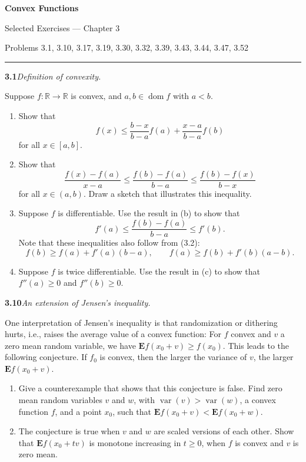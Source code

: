 \documentclass[11pt,a4paper]{article}
\newcommand{\R}{\mathbb{R}}
\newcommand{\dom}{\operatorname{dom}}
\newcommand{\var}{\operatorname{var}}
\newcommand{\E}{\mathbf{E}}
\newcommand{\ex}[2]{%
  \Needspace{5\baselineskip}%
  \par\medskip\noindent\textbf{#1}\quad\textit{#2}\quad\ignorespaces
}
\begin{document}
\begin{center}
  {\LARGE\bfseries Convex Functions}\par
  \vspace{0.4em}
  {\large Selected Exercises --- Chapter 3}\par
  \vspace{0.25em}
  {\small Problems 3.1, 3.10, 3.17, 3.19, 3.30, 3.32, 3.39, 3.43, 3.44, 3.47, 3.52}
\end{center}
\vspace{0.35em}\hrule\vspace{0.8em}

\ex{3.1}{Definition of convexity.}
Suppose $f:\R\to\R$ is convex, and $a,b\in\dom f$ with $a<b$.
\begin{enumerate}
\item Show that
\[
  f(x)\leq \frac{b-x}{b-a}f(a)+\frac{x-a}{b-a}f(b)
\]
for all $x\in[a,b]$.
\item Show that
\[
  \frac{f(x)-f(a)}{x-a}\leq
  \frac{f(b)-f(a)}{b-a}\leq
  \frac{f(b)-f(x)}{b-x}
\]
for all $x\in(a,b)$. Draw a sketch that illustrates this inequality.
\item Suppose $f$ is differentiable. Use the result in (b) to show that
\[
  f'(a)\leq \frac{f(b)-f(a)}{b-a}\leq f'(b).
\]
Note that these inequalities also follow from (3.2):
\[
  f(b)\geq f(a)+f'(a)(b-a),\qquad
  f(a)\geq f(b)+f'(b)(a-b).
\]
\item Suppose $f$ is twice differentiable. Use the result in (c) to show that
$f''(a)\geq0$ and $f''(b)\geq0$.
\end{enumerate}

\ex{3.10}{An extension of Jensen's inequality.}
One interpretation of Jensen's inequality is that randomization or dithering hurts,
i.e., raises the average value of a convex function: For $f$ convex and $v$ a zero
mean random variable, we have $\E f(x_0+v)\geq f(x_0)$. This leads to the following
conjecture. If $f_0$ is convex, then the larger the variance of $v$, the larger
$\E f(x_0+v)$.
\begin{enumerate}
\item Give a counterexample that shows that this conjecture is false. Find zero mean
random variables $v$ and $w$, with $\var(v)>\var(w)$, a convex function $f$, and a
point $x_0$, such that $\E f(x_0+v)<\E f(x_0+w)$.
\item The conjecture is true when $v$ and $w$ are scaled versions of each other.
Show that $\E f(x_0+tv)$ is monotone increasing in $t\geq0$, when $f$ is convex and
$v$ is zero mean.
\end{enumerate}
\end{document}
